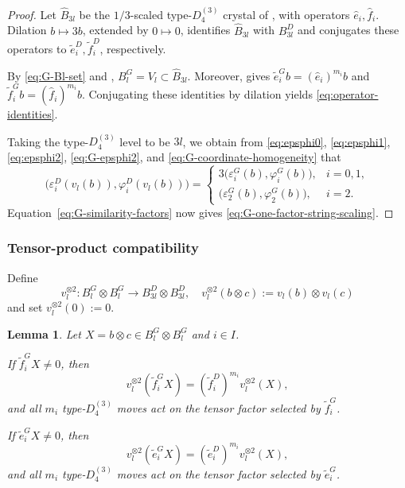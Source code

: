\documentclass[11pt,reqno]{amsart}
\numberwithin{table}{section}
\numberwithin{equation}{section}
\theoremstyle{plain}
\newtheorem{lemma}[theorem]{Lemma}
\theoremstyle{definition}
\begin{document}
\begin{proof}
	Let \(\widehat B_{3l}\) be the \(1/3\)-scaled
	type-\(D_4^{(3)}\) crystal of
	\cite[Section~2, equations~(2.1)--(2.5)]{MMO},
	with operators \(\widehat e_i,\widehat f_i\).
	Dilation \(b\mapsto3b\), extended by \(0\mapsto0\),
	identifies \(\widehat B_{3l}\) with \(B_{3l}^D\)
	and conjugates these operators to
	\(\widetilde e_i^D,\widetilde f_i^D\), respectively.
	
	By \eqref{eq:G-Bl-set} and \cite[(3.1)]{MMO},
	\(B_l^G=V_l\subset\widehat B_{3l}\).
	Moreover, \cite[Proposition~1(2)]{MMO} gives $\widetilde e_i^G b=(\widehat e_i)^{m_i}b$ and $\widetilde f_i^G b=(\widehat f_i)^{m_i}b$.
	Conjugating these identities by dilation yields
	\eqref{eq:operator-identities}.
	
	Taking the type-\(D_4^{(3)}\) level to be \(3l\),
	we obtain from \eqref{eq:epsphi0}, \eqref{eq:epsphi1},
	\eqref{eq:epsphi2}, \eqref{eq:G-epsphi2}, and
	\eqref{eq:G-coordinate-homogeneity} that
	\[
	\bigl(
	\varepsilon_i^D(v_l(b)),
	\varphi_i^D(v_l(b))
	\bigr)
	=
	\begin{cases}
		3\bigl(\varepsilon_i^G(b),\varphi_i^G(b)\bigr),
		&i=0,1,\\
		\bigl(\varepsilon_2^G(b),\varphi_2^G(b)\bigr),
		&i=2.
	\end{cases}
	\]
	Equation~\eqref{eq:G-similarity-factors} now gives
	\eqref{eq:G-one-factor-string-scaling}.
\end{proof}

\subsubsection{Tensor-product compatibility}

Define
\[
v_l^{\otimes2}:
B_l^G\otimes B_l^G
\longrightarrow
B_{3l}^D\otimes B_{3l}^D,
\quad
v_l^{\otimes2}(b\otimes c)
:=
v_l(b)\otimes v_l(c)
\]
and set \(v_l^{\otimes2}(0):=0\).

\begin{lemma}
	\label{lem:G-no-switching}
	Let \(X=b\otimes c\in B_l^G\otimes B_l^G\) and \(i\in I\).
	
	If \(\widetilde f_i^G X\ne0\), then
	\begin{equation}\label{eq:G-tensor-f-similarity}
	v_l^{\otimes2}(\widetilde f_i^G X)
	=
	(\widetilde f_i^D)^{m_i}v_l^{\otimes2}(X),
	\end{equation}
	and all \(m_i\) type-\(D_4^{(3)}\) moves act on the tensor factor
	selected by \(\widetilde f_i^G\).
	
	If \(\widetilde e_i^G X\ne0\), then
	\begin{equation}\label{eq:G-tensor-e-similarity}
		v_l^{\otimes2}(\widetilde e_i^G X)
		=
		(\widetilde e_i^D)^{m_i}v_l^{\otimes2}(X),
	\end{equation}
	and all \(m_i\) type-\(D_4^{(3)}\) moves act on the tensor factor
	selected by \(\widetilde e_i^G\).
\end{lemma}
\end{document}

